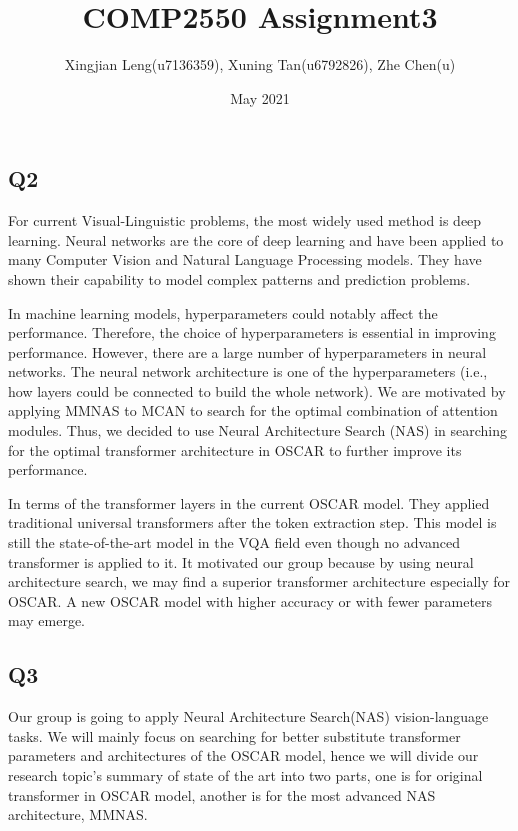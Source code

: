 \documentclass[12pt, a4paper]{article}
\title{COMP2550 Assignment3}
\author{Xingjian Leng(u7136359), Xuning Tan(u6792826), Zhe Chen(u)}
\date{May 2021}
\begin{document}
    
\maketitle

\subsection*{Q2}

\par\noindent For current Visual-Linguistic problems, the most widely used method is deep learning. Neural networks are the core of deep learning and have been applied to many Computer Vision and Natural Language Processing models. They have shown their capability to model complex patterns and prediction problems.

\par\noindent \newline In machine learning models, hyperparameters could notably affect the performance. Therefore, the choice of hyperparameters is essential in improving performance. However, there are a large number of hyperparameters in neural networks. The neural network architecture is one of the hyperparameters (i.e., how layers could be connected to build the whole network). We are motivated by applying MMNAS \cite{DBLP:journals/corr/abs-2004-12070} to MCAN \cite{DBLP:journals/corr/abs-1906-10770} to search for the optimal combination of attention modules. Thus, we decided to use Neural Architecture Search (NAS) in searching for the optimal transformer architecture in OSCAR \cite{DBLP:journals/corr/abs-2004-06165} to further improve its performance.

\par\noindent \newline In terms of the transformer layers in the current OSCAR \cite{DBLP:journals/corr/abs-2004-06165} model. They applied traditional universal transformers \cite{DBLP:journals/corr/VaswaniSPUJGKP17} after the token extraction step. This model is still the state-of-the-art model in the VQA field even though no advanced transformer is applied to it. It motivated our group because by using neural architecture search, we may find a superior transformer architecture especially for OSCAR. A new OSCAR model with higher accuracy or with fewer parameters may emerge.
\subsection{Q3}
Our group is going to apply Neural Architecture Search(NAS) vision-language tasks. 
We will mainly focus on searching for better substitute transformer parameters and architectures 
of the OSCAR model, hence we will divide our research topic's summary of state of the art into 
two parts, one is for original transformer in OSCAR model, another is for the most advanced NAS 
architecture, MMNAS. \\


\end{document}
